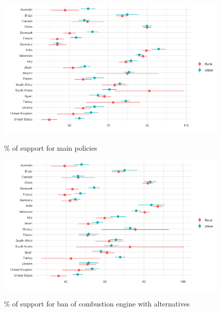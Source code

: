 \begin{frame}{}%
\begin{figure}[h!]
\caption{\% of support for main policies} %
\includegraphics[width=.7\paperwidth]{../figures/country_comparison/main_policies_support_urban_each_country.png} \\
\end{figure}
\end{frame}

\begin{frame}{}%
\begin{figure}[h!]
\caption{\% of support for ban of combustion engine with alternatives} %
\includegraphics[width=.7\paperwidth]{../figures/country_comparison/standard_public_transport_support_urban_each_country.png} \\
\end{figure}
\end{frame}

